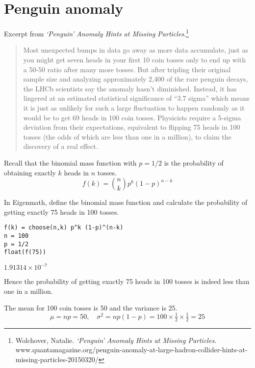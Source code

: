 

\section*{Penguin anomaly}

Excerpt from {\it `Penguin' Anomaly Hints at Missing Particles}.\footnote{
Wolchover, Natalie.
{\it `Penguin' Anomaly Hints at Missing Particles.}\\
www.quantamagazine.org/penguin-anomaly-at-large-hadron-collider-hints-at-missing-particles-20150320/}

\begin{quote}
Most unexpected bumps in data go away as more data accumulate, just as you might get seven heads in your first 10 coin tosses only to end up with a 50-50 ratio after many more tosses. But after tripling their original sample size and analyzing approximately 2,400 of the rare penguin decays, the LHCb scientists say the anomaly hasn't diminished. Instead, it has lingered at an estimated statistical significance of ``3.7 sigma'' which means it is just as unlikely for such a large fluctuation to happen randomly as it would be to get 69 heads in 100 coin tosses. Physicists require a 5-sigma deviation from their expectations, equivalent to flipping 75 heads in 100 tosses (the odds of which are less than one in a million), to claim the discovery of a real effect.
\end{quote}

Recall that the binomial mass function with $p=1/2$
is the probability of obtaining exactly
$k$ heads in $n$ tosses.
\begin{equation*}
f(k)=\binom{n}{k}p^k(1-p)^{n-k}
\end{equation*}

In Eigenmath, define the binomial mass function
and calculate the probability
of getting exactly 75 heads in 100 tosses.

{\color{blue}
\begin{verbatim}
f(k) = choose(n,k) p^k (1-p)^(n-k)
n = 100
p = 1/2
float(f(75))
\end{verbatim}}

$1.91314\times10^{-7}$

\bigskip
Hence the probability of getting exactly 75 heads in 100 tosses is indeed
less than one in a million.

\bigskip
The mean for 100 coin tosses is 50 and the variance is 25.
\begin{equation*}
\mu=np=50,\quad\sigma^2=np(1-p)=100\times\tfrac{1}{2}\times\tfrac{1}{2}=25
\end{equation*}

